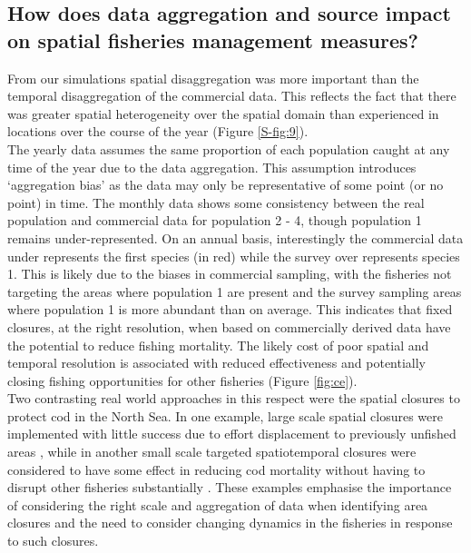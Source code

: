 \documentclass[review]{elsarticle}
\begin{document}
\subsection{How does data aggregation and source impact on spatial fisheries
	management measures?}

From our simulations spatial disaggregation was more important than the
temporal disaggregation of the commercial data. This reflects the fact that
there was greater spatial heterogeneity over the spatial domain than
experienced in  locations over the course of the year (Figure
\ref{S-fig:9}). \\ 

The yearly data assumes the same proportion of each population caught at any
time of the year due to the data aggregation. This assumption introduces
`aggregation bias' as the data may only be representative of some point (or no
point) in time. The monthly data shows some consistency between the real
population and commercial data for population 2 - 4, though population 1 remains
under-represented.  On an annual basis, interestingly the commercial data under
represents the first species (in red) while the survey over represents species
1. This is likely due to the biases in commercial sampling, with the fisheries
not targeting the areas where population 1 are present and the survey sampling
areas where population 1 is more abundant than on average. This indicates that
fixed closures, at the right resolution, when based on commercially derived
data have the potential to reduce fishing mortality. The likely cost
of poor spatial and temporal resolution is associated with reduced
effectiveness and potentially closing fishing opportunities for other fisheries
(Figure \ref{fig:ce}). \\

Two contrasting real world approaches in this respect were the spatial closures
to protect cod in the North Sea. In one example, large scale spatial closures
were implemented with little success due to effort displacement to previously
unfished areas \citep{Dinmore2003}, while in another small scale targeted
spatiotemporal closures were considered to have some effect in reducing cod
mortality without having to disrupt other fisheries substantially
\citep{Needle2011}. These examples emphasise the importance of considering the
right scale and aggregation of data when identifying area closures and the need
to consider changing dynamics in the fisheries in response to such closures. \\
\end{document}
